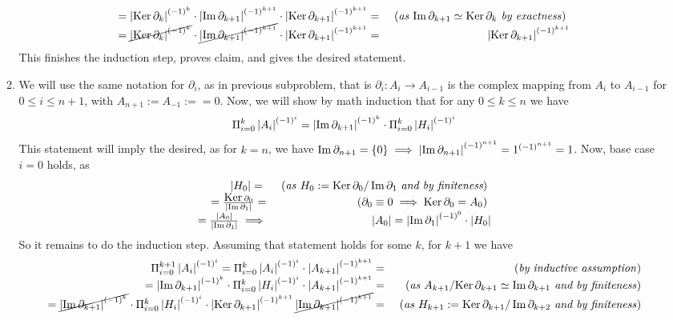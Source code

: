 \documentclass[8pt,fleqn]{article} %
\newcommand{\Ker}{\mbox{\normalfont Ker\,}}
\begin{document}
\begin{enumerate}[label=\bfseries Problem \arabic*.]
\begin{enumerate}[label=(\arabic*).]
\[\begin{array}{rr}
			={\myabs{\Ker\partial_k}^{(-1)^k}}\cdot{\myabs{\Im\partial_{k+1}}^{(-1)^{k+1}}}
				\cdot\myabs{\Ker\partial_{{k+1}}}^{(-1)^{k+1}}=
			&\mbox{ (\textit{as ${\Im\partial_{k+1}}\simeq{\Ker\partial_k}$ by exactness}) }\\
			=\cancel{\myabs{\Ker\partial_k}^{(-1)^k}}\cdot\cancel{\myabs{\Im\partial_{k+1}}^{(-1)^{k+1}}}
				\cdot\myabs{\Ker\partial_{{k+1}}}^{(-1)^{k+1}}=
			&\myabs{\Ker\partial_{{k+1}}}^{(-1)^{k+1}}
		\end{array}\]
		This finishes the induction step, proves claim, and gives the desired statement.
			\item We will use the same notation for $\partial_i$, as in previous subproblem, that is $\partial_i:A_i\to
				A_{i-1}$ is the complex mapping from $A_i$ to $A_{i-1}$ for $0\leq i\leq n+1$, with $A_{n+1}:=A_{-1}:=
				=0$. Now, we will show by math induction that for any $0\leq k\leq n$ we have
				\[\Pi_{i=0}^k\left|A_i\right|^{(-1)^i}=\left|\operatorname{Im}\partial_{k+1}\right|^{(-1)^{k}}\cdot
				\Pi_{i=0}^k\left|H_i\right|^{(-1)^i}\]
				This statement will imply the desired, as for $k=n$, we have $\operatorname{Im}\partial_{n+1}=\left\{0\right\}\implies
				\left|\operatorname{Im}\partial_{n+1}\right|^{(-1)^{n+1}}=1^{(-1)^{n+1}}=1$. Now, base case $i=0$ holds, as
		\[\begin{array}{rr}
			\myabs{H_0}=\
			&\mbox{ (\textit{as} $H_0:=\Ker\partial_0/\Im\partial_{1}$ {\it and by finiteness}) }\\
			=\frac{\Ker\partial_0}{\myabs{\Im\partial_1}}=
			&\mbox{ ({$\partial_0\equiv0\implies\Ker\partial_0=A_0$}) }\\
			=\frac{\myabs{A_0}}{\myabs{\Im\partial_1}}\implies&\myabs{A_0}=\myabs{\Im\partial_1}^{(-1)^0}\cdot\myabs{H_0}
		\end{array}\]
		So it remains to do the induction step. Assuming that statement holds for some $k$, for $k+1$ we have
		\noindent\[\begin{array}{rr}
		\Pi_{i=0}^{k+1}\myabs{A_i}^{(-1)^i}=\Pi_{i=0}^k\myabs{A_i}^{(-1)^i}\cdot\myabs{A_{k+1}}^{(-1)^{k+1}}=
		&\myexplain{by inductive assumption}\\
		=\myabs{\Im\partial_{k+1}}^{(-1)^{k}}\cdot\Pi_{i=0}^k\myabs{H_i}^{(-1)^i}\cdot\myabs{A_{k+1}}^{(-1)^{k+1}}=
		&\myexplain{as $A_{k+1}/\Ker\partial_{k+1}\simeq\Im\partial_{k+1}$ and by finiteness}\\
		=\cancel{\myabs{\Im\partial_{k+1}}^{(-1)^{k}}}
		\cdot\Pi_{i=0}^k\myabs{H_i}^{(-1)^i}\cdot\myabs{\Ker\partial_{k+1}}^{(-1)^{k+1}}
		\cancel{\myabs{\Im\partial_{k+1}}^{(-1)^{k+1}}}=
		&\myexplain{{as} $H_{k+1}:=\Ker\partial_{k+1}/\Im\partial_{k+2}$ {and by finiteness}}\\

\end{array}\]
\end{enumerate}
\end{enumerate}
\end{document}
